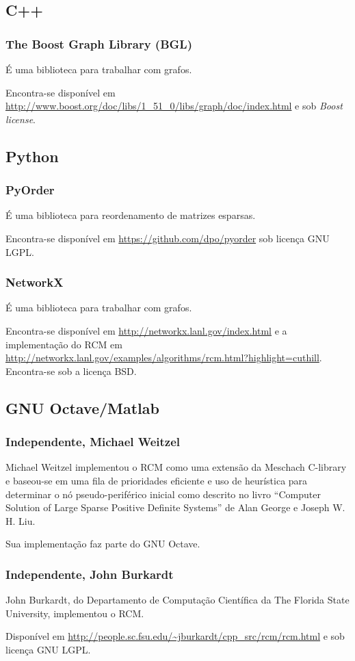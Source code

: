 \subsection{C++}
\subsubsection{The Boost Graph Library (BGL)}
É uma biblioteca para trabalhar com grafos.

Encontra-se disponível em
\url{http://www.boost.org/doc/libs/1_51_0/libs/graph/doc/index.html} e sob
\textit{Boost license}.

\subsection{Python}
\subsubsection{PyOrder}
É uma biblioteca para reordenamento de matrizes esparsas.

Encontra-se disponível em \url{https://github.com/dpo/pyorder} sob licença GNU
LGPL.

\subsubsection{NetworkX}
É uma biblioteca para trabalhar com grafos.

Encontra-se disponível em \url{http://networkx.lanl.gov/index.html} e a
implementação do RCM em
\url{http://networkx.lanl.gov/examples/algorithms/rcm.html?highlight=cuthill}.
Encontra-se sob a licença BSD.

\subsection{GNU Octave/Matlab}
\subsubsection{Independente, Michael Weitzel}
Michael Weitzel implementou o RCM como uma extensão da Meschach
C-library e baseou-se em uma fila de prioridades eficiente e uso de
heurística para determinar o nó pseudo-periférico inicial como
descrito no livro ``Computer Solution of Large Sparse Positive Definite
Systems'' de Alan George
e Joseph W. H. Liu.

Sua implementação faz parte do GNU Octave.

\subsubsection{Independente, John Burkardt}
John Burkardt, do Departamento de Computação Científica da The Florida State
University, implementou o RCM.

Disponível em \url{http://people.sc.fsu.edu/~jburkardt/cpp_src/rcm/rcm.html} e
sob licença GNU LGPL.
